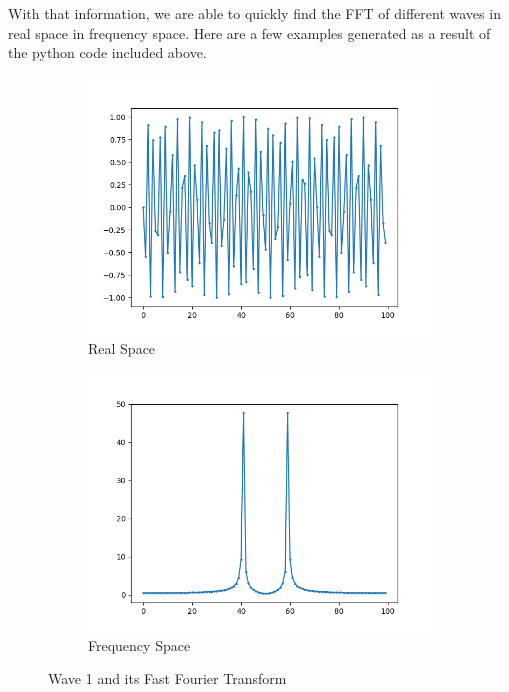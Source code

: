 \documentclass{amsproc}
\begin{document}
With that information, we are able to quickly find the FFT of different waves in real space in frequency space. Here are a few examples generated as a result of the python code included above. 

\begin{figure}[h]
\centering
\begin{subfigure}{.4\textwidth}
	\centering
	\includegraphics[scale=.3]{FFTOriginal1.png}
	\caption{Real Space}
	\label{fig:sub1}
\end{subfigure} %
\begin{subfigure}{.4\textwidth}
	\centering
	\includegraphics[scale=.3]{FFTResult1.png}
	\caption{Frequency Space}
	\label{fig:sub2}
\end{subfigure}
\caption{Wave 1 and its Fast Fourier Transform}
\label{fig:text1}
\end{figure}
\end{document}
